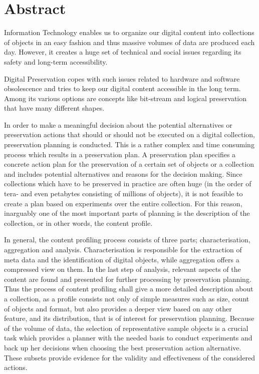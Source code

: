 \chapter*{Abstract}
\vspace{-1cm}
Information Technology enables us to organize our digital content into collections of objects in an easy fashion and thus massive volumes of data are produced each day.
However, it creates a huge set of technical and social issues regarding its safety and long-term accessibility.

Digital Preservation copes with such issues related to hardware and software obsolescence and tries to keep our digital content accessible in the long term.
Among its various options are concepts like bit-stream and logical preservation that have many different shapes.

In order to make a meaningful decision about the potential alternatives or preservation actions that should or should not be executed on a digital collection, preservation planning is conducted.
This is a rather complex and time consuming process which results in a preservation plan.
A preservation plan specifies a concrete action plan for the preservation of a certain set of objects or a collection and includes potential alternatives and reasons for the decision making.
Since collections which have to be preserved in practice are often huge (in the order of tera- and even petabytes consisting of millions of objects), it is not feasible to create a plan based on experiments over the entire collection. 
For this reason, inarguably one of the most important parts of planning is the description of the collection, or in other words, the content profile.

In general, the content profiling process consists of three parts; characterisation, aggregation and analysis.
Characterisation is responsible for the extraction of meta data and the identification of digital objects, while aggregation offers a compressed view on them.
In the last step of analysis, relevant aspects of the content are found and presented for further processing by preservation planning.
Thus the process of content profiling shall give a more detailed description about a collection, as a profile consists not only of simple measures such as size, count of objects and format, but also provides a deeper view based on any other feature, and its distribution, that is of interest for preservation planning.
Because of the volume of data, the selection of representative sample objects is a crucial task which provides a planner with the needed basis to conduct experiments and back up her decisions when choosing the best preservation action alternative.
These subsets provide evidence for the validity and effectiveness of the considered actions.

